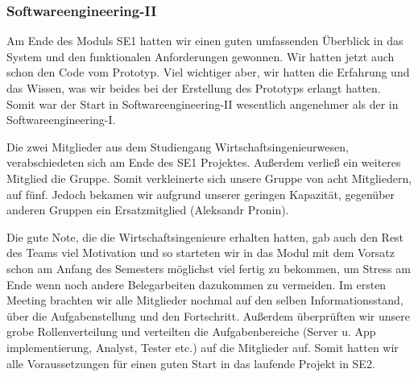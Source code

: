 \documentclass[10pt]{article}
\begin{document}
\subsubsection{Softwareengineering-II}
Am Ende des Moduls SE1 hatten wir einen guten umfassenden
Überblick in das System und den funktionalen Anforderungen gewonnen. 
Wir hatten jetzt auch schon den Code vom Prototyp. Viel wichtiger aber, wir hatten die Erfahrung und das Wissen, was
wir beides bei der Erstellung des Prototyps erlangt hatten. Somit war der Start in Softwareengineering-II wesentlich
angenehmer als der in Softwareengineering-I.\par
\medskip
Die zwei Mitglieder aus dem Studiengang Wirtschaftsingenieurwesen, verabschiedeten 
sich am Ende des SE1 Projektes.
Außerdem verließ ein weiteres Mitglied die Gruppe. Somit verkleinerte sich unsere Gruppe von acht Mitgliedern,
auf fünf. Jedoch bekamen wir aufgrund unserer geringen Kapazität, 
gegenüber anderen Gruppen ein Ersatzmitglied (Aleksandr Pronin). \par 
\medskip
 Die gute Note, die die Wirtschaftsingenieure erhalten hatten, gab auch den
Rest des Teams viel Motivation und so starteten wir in das Modul mit dem Vorsatz schon am Anfang des Semesters möglichst
viel fertig zu bekommen, um Stress am Ende wenn noch andere Belegarbeiten dazukommen zu vermeiden.
Im ersten Meeting brachten wir alle Mitglieder nochmal auf den selben Informationsstand, 
über die Aufgabenstellung und den Fortschritt. 
Außerdem überprüften wir unsere grobe Rollenverteilung und verteilten die Aufgabenbereiche 
(Server u. App implementierung, Analyst, Tester etc.)
auf die Mitglieder auf. Somit hatten wir alle Voraussetzungen für einen guten Start in das laufende Projekt in SE2.
\end{document}
